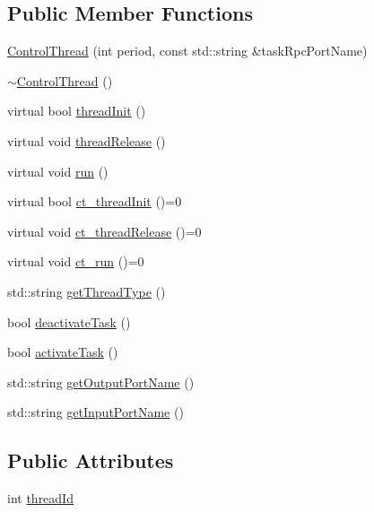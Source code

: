 \subsection*{Public Member Functions}
\begin{DoxyCompactItemize}
\item 
\hyperlink{classocra__recipes_1_1ControlThread_a9cbd7d52df2dc070365a14d8c0c800f3}{Control\+Thread} (int period, const std\+::string \&task\+Rpc\+Port\+Name)
\item 
\hyperlink{classocra__recipes_1_1ControlThread_ae1dbbb5ec386b01a88e10ad37f3675bd}{$\sim$\+Control\+Thread} ()
\item 
virtual bool \hyperlink{classocra__recipes_1_1ControlThread_ad4a51369f70181e22a3ee4980a5abd13}{thread\+Init} ()
\item 
virtual void \hyperlink{classocra__recipes_1_1ControlThread_a62c6401278b62bd291722d7652ace6af}{thread\+Release} ()
\item 
virtual void \hyperlink{classocra__recipes_1_1ControlThread_aa86fb4137489b8bd8bd2ac32b737b58f}{run} ()
\item 
virtual bool \hyperlink{classocra__recipes_1_1ControlThread_a4b2471a82ae344ea4c9e96943604cb94}{ct\+\_\+thread\+Init} ()=0
\item 
virtual void \hyperlink{classocra__recipes_1_1ControlThread_ade246d31ff5f81978e3920b7fb1b6abb}{ct\+\_\+thread\+Release} ()=0
\item 
virtual void \hyperlink{classocra__recipes_1_1ControlThread_a2890887a72bdae6d16af762455eb3d3f}{ct\+\_\+run} ()=0
\item 
std\+::string \hyperlink{classocra__recipes_1_1ControlThread_ac7552b020cf2009d5ceff8c67e0a2037}{get\+Thread\+Type} ()
\item 
bool \hyperlink{classocra__recipes_1_1ControlThread_a994fe44acbacf847cdf5a692c59f347a}{deactivate\+Task} ()
\item 
bool \hyperlink{classocra__recipes_1_1ControlThread_a68b22022240de911c5131b642a9eff1a}{activate\+Task} ()
\item 
std\+::string \hyperlink{classocra__recipes_1_1ControlThread_a7d60403bfe70275c84d556985faac038}{get\+Output\+Port\+Name} ()
\item 
std\+::string \hyperlink{classocra__recipes_1_1ControlThread_a1082fa50dfacb28ffc37f8daf6417649}{get\+Input\+Port\+Name} ()
\end{DoxyCompactItemize}
\subsection*{Public Attributes}
\begin{DoxyCompactItemize}
\item 
int \hyperlink{classocra__recipes_1_1ControlThread_abbcc309053e54da8531c77bac2dd1656}{thread\+Id}
\end{DoxyCompactItemize}
